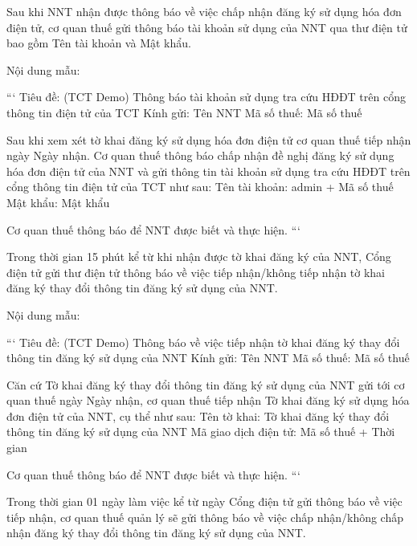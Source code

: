 
Sau khi NNT nhận được thông báo về việc chấp nhận đăng ký sử dụng hóa đơn điện tử, cơ quan thuế gửi thông báo tài khoản sử dụng của NNT qua thư điện tử bao gồm Tên tài khoản và Mật khẩu.

Nội dung mẫu:

```
Tiêu đề: (TCT Demo) Thông báo tài khoản sử dụng tra cứu HĐĐT trên cổng thông tin điện tử của TCT
Kính gửi: {{Tên NNT}}
Mã số thuế: {{Mã số thuế}}

Sau khi xem xét tờ khai đăng ký sử dụng hóa đơn điện tử cơ quan thuế tiếp nhận ngày {{Ngày nhận}}.
Cơ quan thuế thông báo chấp nhận đề nghị đăng ký sử dụng hóa đơn điện tử của NNT và gửi thông tin tài khoản sử dụng tra cứu HĐĐT trên cổng thông tin điện tử của TCT như sau:
Tên tài khoản: {{admin + Mã số thuế}}
Mật khẩu: {{Mật khẩu}}

Cơ quan thuế thông báo để NNT được biết và thực hiện.
```



Trong thời gian 15 phút kể từ khi nhận được tờ khai đăng ký của NNT, Cổng điện tử gửi thư điện tử thông báo về việc tiếp nhận/không tiếp nhận tờ khai đăng ký thay đổi thông tin đăng ký sử dụng của NNT.

Nội dung mẫu:

```
Tiêu đề: (TCT Demo) Thông báo về việc tiếp nhận tờ khai đăng ký thay đổi thông tin đăng ký sử dụng của NNT
Kính gửi: {{Tên NNT}}
Mã số thuế: {{Mã số thuế}}

Căn cứ Tờ khai đăng ký thay đổi thông tin đăng ký sử dụng của NNT gửi tới cơ quan thuế ngày {{Ngày nhận}}, cơ quan thuế tiếp nhận Tờ khai đăng ký sử dụng hóa đơn điện tử của NNT, cụ thể như sau:
Tên tờ khai: Tờ khai đăng ký thay đổi thông tin đăng ký sử dụng của NNT
Mã giao dịch điện tử: {{Mã số thuế + Thời gian}}

Cơ quan thuế thông báo để NNT được biết và thực hiện.
```


Trong thời gian 01 ngày làm việc kể từ ngày Cổng điện tử gửi thông báo về việc tiếp nhận, cơ quan thuế quản lý sẽ gửi thông báo về việc chấp nhận/không chấp nhận đăng ký thay đổi thông tin đăng ký sử dụng của NNT.

